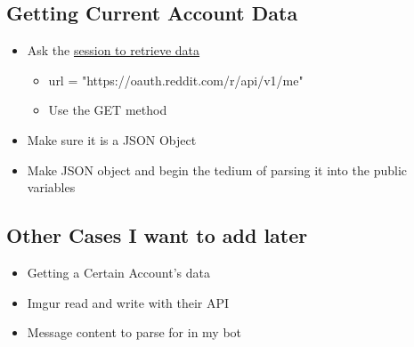\documentclass[12pt]{article}
\begin{document}
\subsection{Getting Current Account Data}
\begin{itemize}
	\item Ask the \hyperlink{Read Data (session)}{session to retrieve data}
	\begin{itemize}
		\item url = "https://oauth.reddit.com/r/api/v1/me"
		\item Use the GET method
	\end{itemize}
	\item Make sure it is a JSON Object
	\item Make JSON object and begin the tedium of parsing it into the public variables
\end{itemize}

\subsection{Other Cases I want to add later}
\begin{itemize}
	\item Getting a Certain Account's data
	\item Imgur read and write with their API
	\item Message content to parse for in my bot
\end{itemize}

\newpage
\end{document}
